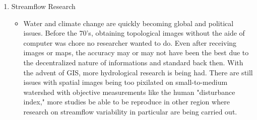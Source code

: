 \documentclass{article}
\begin{document}
\begin{enumerate}
\begin{itemize}
        \end{itemize}

    \item Streamflow Research

        \begin{itemize}

            \item Water and climate change are quickly becoming global and political issues. Before the 70's, obtaining topological images without the aide of computer was chore no researcher wanted to do. Even after receiving images or maps, the accuracy may or may not have been the best due to the decentralized nature of informations and standard back then. With the advent of GIS, more hydrological research is being had. There are still issues with spatial images being too pixilated on small-to-medium watershed with objective measurements like the human "disturbance index," more studies be able to be reproduce in other region where research on streamflow variability in particular are being carried out. 

        \end{itemize}
\end{enumerate}
\end{document}
